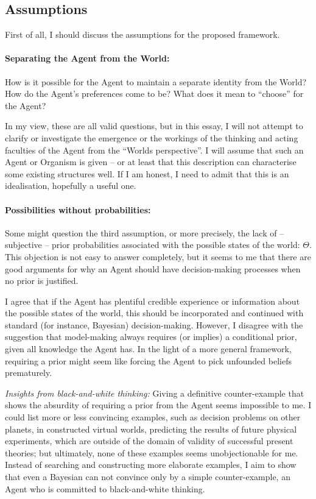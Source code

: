 \documentclass{article}
\begin{document}
\subsection*{Assumptions}

First of all, I should discuss the assumptions for the proposed framework.

\paragraph{Separating the Agent from the World:}
How is it possible for the Agent to maintain a separate identity from the World? How do the Agent's preferences come to be? What does it mean to ``choose'' for the Agent?

In my view, these are all valid questions, but in this essay, I will not attempt to clarify or investigate the emergence or the workings of the thinking and acting faculties of the Agent from the ``Worlds perspective''. I will assume that such an Agent or Organism is given – or at least that this description can characterise some existing structures well. If I am honest, I need to admit that this is an idealisation, hopefully a useful one.

\paragraph{Possibilities without probabilities:}
Some might question the third assumption, or more precisely, the lack of – subjective – prior probabilities associated with the possible states of the world: $\Theta$. This objection is not easy to answer completely, but it seems to me that there are good arguments for why an Agent should have decision-making processes when no prior is justified.

I agree that if the Agent has plentiful credible experience or information about the possible states of the world, this should be incorporated and continued with standard (for instance, Bayesian) decision-making.
However, I disagree with the suggestion that model-making always requires (or implies) a conditional prior, given all knowledge the Agent has. In the light of a more general framework, requiring a prior might seem like forcing the Agent to pick unfounded beliefs prematurely.

{\it Insights from black-and-white thinking:}
Giving a definitive counter-example that shows the absurdity of requiring a prior from the Agent seems impossible to me. I could list more or less convincing examples, such as decision problems on other planets, in constructed virtual worlds, predicting the results of future physical experiments, which are outside of the domain of validity of successful present theories; but ultimately, none of these examples seems unobjectionable for me.
Instead of searching and constructing more elaborate examples, I aim to show that even a Bayesian can not convince only by a simple counter-example, an Agent who is committed to black-and-white thinking.
\end{document}

